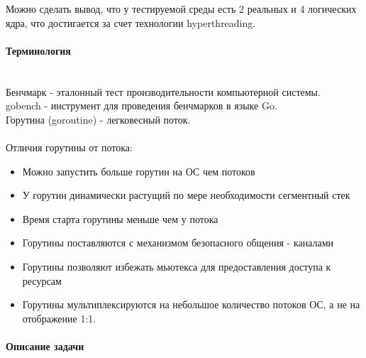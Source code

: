 \documentclass[utf8x, 12pt]{G7-32} %
\begin{document}
Можно сделать вывод, что у тестируемой среды есть 2 реальных и 4 логических ядра, что достигается за счет технологии hyperthreading.

\newpage

\paragraph{Терминология}
\\
Бенчмарк - эталонный тест производительности компьютерной системы.\\
gobench - инструмент для проведения бенчмарков в языке Go.\\
Горутина (goroutine) - легковесный поток.\\
\\
Отличия горутины от потока:

\begin{itemize}
	\item Можно запустить больше горутин на ОС чем потоков
	\item У горутин динамически растущий по мере необходимости сегментный стек
	\item Время старта горутины меньше чем у потока
	\item Горутины поставляются с механизмом безопасного общения - каналами
	\item Горутины позволяют избежать мьютекса для предоставления доступа к ресурсам
	\item Горутины мультиплексируются на небольшое количество потоков ОС, а не на отображение 1:1.
\end{itemize}

\newpage

\paragraph{Описание задачи}
\end{document}
